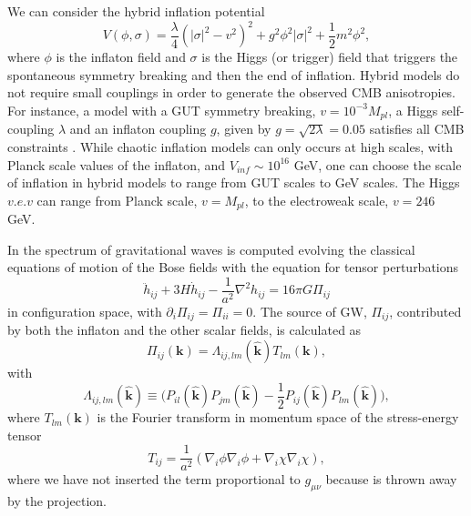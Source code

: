 \documentclass[11pt,a4paper,twoside]{book}
\begin{document}
We can consider  the hybrid inflation potential
\begin{equation}
\label{Chap7:HybridPotential}
V(\phi,\sigma)=\frac{\lambda}{4}(|\sigma|^{2}-v^{2})^{2} +  g^{2}\phi^{2}|\sigma|^{2} + \frac{1}{2}m^{2}\phi^{2},
\end{equation}
where $ \phi $ is the inflaton field and $\sigma$ is the Higgs (or trigger) field that triggers the spontaneous symmetry breaking and then the end of inflation. Hybrid models do not require small couplings in order to generate the observed CMB anisotropies. For instance, a model with a GUT symmetry breaking, $ v=10^{-3}M_{pl} $, a Higgs self-coupling $\lambda$ and an inflaton coupling $ g $, given by $ g=\sqrt{2\lambda}=0.05 $ satisfies all CMB constraints \cite{Chap7:HybridModel}. While chaotic inflation models can only occurs at high scales, with Planck scale values of the inflaton, and $ V_{inf} \sim 10^{16} $ GeV, one can choose the scale of inflation in hybrid models to range from GUT scales to GeV scales. The Higgs $ v.e.v $ can range from Planck scale, $ v=M_{pl} $, to the electroweak scale, $ v=246 $ GeV.

In \cite{Chap7:HybridModel} the spectrum of gravitational waves is computed evolving the classical equations of motion of the Bose fields with the equation for tensor perturbations
\begin{equation}
\label{HybridModelsTensorPerturbations}
\ddot{h}_{ij} + 3H\dot{h}_{ij}-\frac{1}{a^{2}}\nabla^{2}h_{ij}=16\pi G \Pi_{ij}
\end{equation}
in configuration space, with $ \partial_{i}\Pi_{ij}=\Pi_{ii}=0 $. The source of GW, $\Pi_{ij}$, contributed by both the inflaton and the other scalar fields, is calculated as 
\begin{equation}
	\label{Chap7:HybridModels_SourceGWs}
	\Pi_{ij}(\textbf{k})=\Lambda_{ij,lm}(\hat{\textbf{k}})T_{lm}(\textbf{k}),
\end{equation}
with
\begin{equation}
	\label{Chap7:HybridModels_ProjectorLmabda}
	\Lambda_{ij,lm}(\hat{\textbf{k}}) \equiv \Bigg(P_{il}(\hat{\textbf{k}})P_{jm}(\hat{\textbf{k}}) - \frac{1}{2}P_{ij}(\hat{\textbf{k}})P_{lm}(\hat{\textbf{k}})\Bigg),
\end{equation}
where $ T_{lm}(\textbf{k}) $ is the Fourier transform in momentum space of the stress-energy tensor
\begin{equation}
\label{Chap7:HybridModels_StressEnergyTensor}
T_{ij}=\frac{1}{a^{2}}(\nabla_{i}\phi\nabla_{i}\phi + \nabla_{i}\chi\nabla_{i}\chi ),
\end{equation}
where we have not inserted the term proportional to $ g_{\mu\nu} $ because is thrown away by the projection. 
\end{document}

